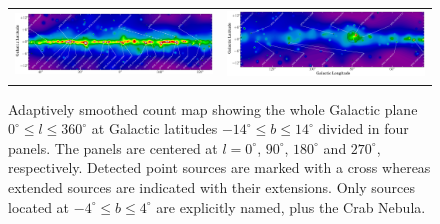 {\begin{figure}[!ht]
    \begin{center}
        \begin{tabular}{ll}
                    \includegraphics[angle=90,scale=.3]{Figures/Galactic_plane_CAR_1of4_sqrt_spectral_2FHL.eps}&
                    \includegraphics[angle=90,scale=.3]{Figures/Galactic_plane_CAR_2of4_sqrt_spectral_2FHL.eps}\\
            
            
        \end{tabular}
    \end{center}
    \caption[Adaptively smoothed count maps showing the whole Galactic plane]{Adaptively smoothed count map showing the whole Galactic plane $0^{\circ}\leq l\leq 360^{\circ}$ at Galactic latitudes $-14^{\circ} \leq b\leq 14^{\circ}$ divided in four  panels. The panels are centered at $l=0^{\circ}$, $90^{\circ}$, $180^{\circ}$ and $270^{\circ}$, respectively. Detected point sources are marked with a cross whereas extended sources are indicated with  their extensions. Only sources located at $-4^{\circ} \leq b\leq 4^{\circ}$ are explicitly named, plus the Crab Nebula.
        \label{fig:gp1}}
\end{figure}


}
